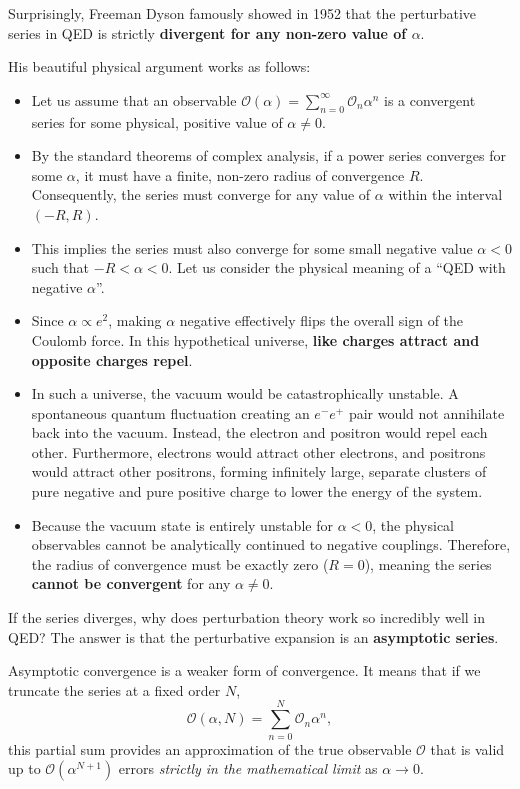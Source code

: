 Surprisingly, Freeman Dyson famously showed in 1952 that the perturbative series in QED is strictly \textbf{divergent for any non-zero value of \(\alpha\)}.

His beautiful physical argument works as follows:
\begin{itemize}
    \item Let us assume that an observable \(\mathcal{O}(\alpha) = \sum_{n=0}^\infty \mathcal{O}_n \alpha^n\) is a convergent series for some physical, positive value of \(\alpha \neq 0\).
    \item By the standard theorems of complex analysis, if a power series converges for some \(\alpha\), it must have a finite, non-zero radius of convergence \(R\). Consequently, the series must converge for any value of \(\alpha\) within the interval \((-R, R)\).
    \item This implies the series must also converge for some small negative value \(\alpha < 0\) such that \(-R < \alpha < 0\). Let us consider the physical meaning of a ``QED with negative \(\alpha\)''.
    \item Since \(\alpha \propto e^2\), making \(\alpha\) negative effectively flips the overall sign of the Coulomb force. In this hypothetical universe, \textbf{like charges attract and opposite charges repel}.
    \item In such a universe, the vacuum would be catastrophically unstable. A spontaneous quantum fluctuation creating an \(e^- e^+\) pair would not annihilate back into the vacuum. Instead, the electron and positron would repel each other. Furthermore, electrons would attract other electrons, and positrons would attract other positrons, forming infinitely large, separate clusters of pure negative and pure positive charge to lower the energy of the system.
    \item Because the vacuum state is entirely unstable for \(\alpha < 0\), the physical observables cannot be analytically continued to negative couplings. Therefore, the radius of convergence must be exactly zero (\(R=0\)), meaning the series \textbf{cannot be convergent} for any \(\alpha \neq 0\).
\end{itemize}

If the series diverges, why does perturbation theory work so incredibly well in QED? The answer is that the perturbative expansion is an \textbf{asymptotic series}.

Asymptotic convergence is a weaker form of convergence. It means that if we truncate the series at a fixed order \(N\),
\[
    \mathcal{O}(\alpha, N) = \sum_{n=0}^N \mathcal{O}_n \alpha^n,
\]
this partial sum provides an approximation of the true observable \(\mathcal{O}\) that is valid up to \(\mathcal{O}(\alpha^{N+1})\) errors \textit{strictly in the mathematical limit} as \(\alpha \to 0\).

